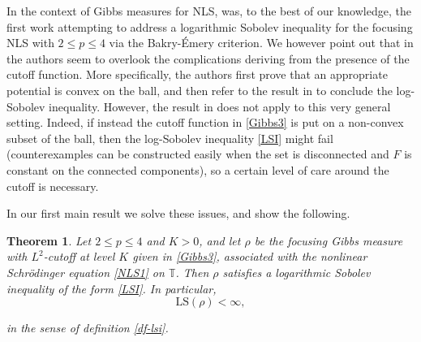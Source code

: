 \documentclass[letterpaper, 11pt,  reqno]{amsart}
\newtheorem{theorem}{Theorem} [section]
\theoremstyle{definition}
\newcommand{\1}{\mathbbm 1}
\newcommand{\noi}{\noindent}
\newcommand{\T}{\mathbb{T}}
\newcommand{\0}{\mathbf 0}
\numberwithin{equation}{section}
\numberwithin{theorem}{section}
\begin{document}
 
 
In the context of Gibbs measures for NLS, \cite{BlowerBD} was, to the best of our knowledge, the first work attempting to address a logarithmic Sobolev inequality for the focusing NLS with $2 \le p \le 4$ via the Bakry-\'Emery criterion. We however point out that in \cite{BlowerBD} the authors seem to overlook the complications deriving from the presence of the cutoff function. More specifically, the authors first prove that an appropriate potential is convex on the ball, and then refer to the result in \cite{BaEm} to conclude the log-Sobolev inequality. However, the result in \cite{BaEm} does not apply to this very general setting. Indeed, if instead the cutoff function in \eqref{Gibbs3} is put on a non-convex subset of the ball, then the log-Sobolev inequality \eqref{LSI} might fail (counterexamples can be constructed easily when the set is disconnected and $F$ is constant on the connected components), so a certain level of care around the cutoff is necessary.
 
In our first main result we solve these issues, and show the following.
 
\begin{theorem}\label{thm:LS}
Let $2 \le p \le 4$ and $K>0$, and let $\rho$ be the focusing Gibbs measure
with $L^2$-cutoff at level $K$ given in \eqref{Gibbs3}, associated with the
nonlinear Schr\"odinger equation \eqref{NLS1} on $\T$.
Then $\rho$ satisfies a logarithmic Sobolev inequality of the form
\eqref{LSI}. In particular,
\[
   \mathrm{LS}(\rho) < \infty,
\]
 
 
\noi
in the sense of 
definition
\eqref{df-lsi}.
 
 
\end{theorem}
 
\end{document}
